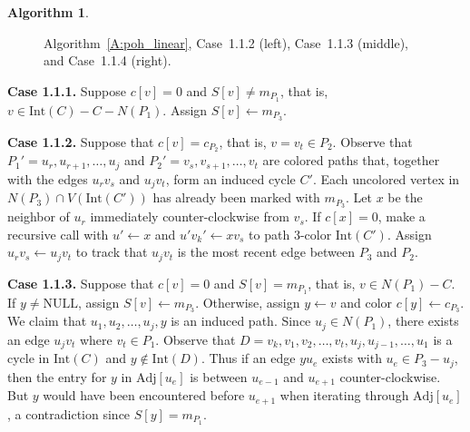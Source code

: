 \documentclass[12pt,letterpaper]{article}
\theoremstyle{plain}
\theoremstyle{definition}
\theoremstyle{break}
\newtheorem{algorithm}[lemma]{Algorithm}     %
\begin{document}
\begin{algorithm}
\begin{figure}[ht]
\begin{center}
\caption{Algorithm~\ref{A:poh_linear}, Case~1.1.2 (left), Case~1.1.3 (middle),
and Case~1.1.4 (right).}\label{F:poh_linear_1}
\end{center}
\end{figure}

\textbf{Case 1.1.1.} Suppose $c[v]=0$ and $S[v]\ne m_{P_1}$, that is,
$v\in\text{Int}(C)-C-N(P_1)$. Assign $S[v]\leftarrow m_{P_3}$.

\textbf{Case 1.1.2.} Suppose that $c[v]=c_{P_2}$, that is, $v=v_t\in P_2$.
Observe that $P_1'=u_r,u_{r+1},\ldots, u_j$ and $P_2'=v_s,v_{s+1},\ldots,v_t$
are colored paths that, together with the edges $u_rv_s$ and $u_jv_t$,
form an induced cycle $C'$. Each uncolored vertex in
$N(P_3)\cap V(\text{Int}(C'))$ has already been marked with $m_{P_3}$.
Let
$x$ be the neighbor of $u_r$ immediately counter-clockwise from $v_s$.
If $c[x]=0$, make a recursive call with $u'\leftarrow x$ and
$u'v_k'\leftarrow xv_s$ to path $3$-color $\text{Int}(C')$. Assign
$u_rv_s\leftarrow u_jv_t$ to track that $u_jv_t$ is the most recent edge between
$P_3$ and $P_2$.

\textbf{Case 1.1.3.} Suppose that $c[v]=0$ and $S[v]=m_{P_1}$, that is,
$v\in N(P_1)-C$. If $y\ne\text{NULL}$, assign $S[v]\leftarrow m_{P_3}$.
Otherwise, assign $y\leftarrow v$ and color
$c[y]\leftarrow c_{P_3}$. We claim that $u_1,u_2,\ldots,u_j,y$ is an induced
path. Since $u_j\in N(P_1)$, there exists an edge $u_jv_t$ where $v_t\in P_1$.
Observe that $D=v_k,v_1,v_2,\ldots,v_t,u_j,u_{j-1},\ldots,u_1$ is a cycle in
$\text{Int}(C)$ and $y\not\in\text{Int}(D)$. Thus if an edge $yu_e$ exists with
$u_e\in P_3-u_j$,
then the entry for $y$ in $\text{Adj}[u_e]$ is between $u_{e-1}$ and
$u_{e+1}$ counter-clockwise.
But $y$ would have been encountered before $u_{e+1}$
when iterating through $\text{Adj}[u_e]$, a contradiction since
$S[y]=m_{P_1}$.


\end{algorithm}
\end{document}
